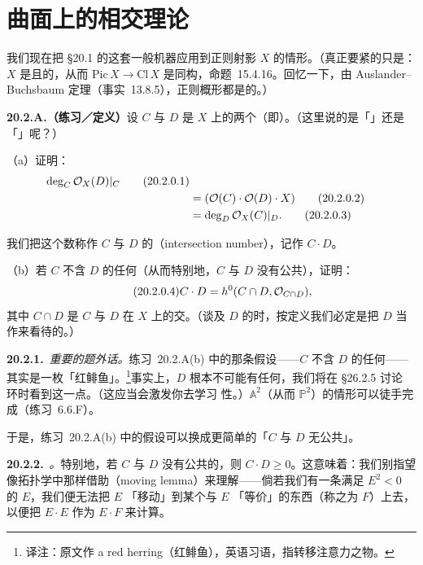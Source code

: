 
\section{曲面上的相交理论}

我们现在把 \S20.1 的这套一般机器应用到正则射影\trSurface{} $X$ 的情形。（真正要紧的只是：$X$ 是\trNoetherian{}且\trFactorial{}的，从而 $\mathrm{Pic}\,X\to\mathrm{Cl}\,X$ 是同构，\mbox{命题~15.4.16}。回忆一下，由 Auslander--Buchsbaum 定理（\mbox{事实~13.8.5}），正则概形都是\trFactorial{}的。）

\textbf{20.2.A.（练习／定义）}\quad 设 $C$ 与 $D$ 是 $X$ 上的两个\trEffectiveDivisor（即\trCurve{}）。（这里说的是「\trWeilDivisor」还是「\trCartierDivisor」呢？）

（a）证明：
\begin{align*}
\deg_C\mathcal{O}_X(D)|_C \tag{20.2.0.1}\label{eq:surface-intersection-deg-c}\\
&= (\mathcal{O}(C)\cdot\mathcal{O}(D)\cdot X) \tag{20.2.0.2}\label{eq:surface-intersection-euler}\\
&= \deg_D\mathcal{O}_X(C)|_D. \tag{20.2.0.3}\label{eq:surface-intersection-deg-d}
\end{align*}

我们把这个数称作 $C$ 与 $D$ 的\textbf{\trIntersectionNumber}（intersection number），记作 $C\cdot D$。

（b）若 $C$ 不含 $D$ 的任何\trAssociatedPoint（从而特别地，$C$ 与 $D$ 没有公共\trIrreducibleComponent），证明：
\begin{equation*}\tag{20.2.0.4}\label{eq:surface-intersection-h0}
C\cdot D=h^0(C\cap D,\mathcal{O}_{C\cap D}),
\end{equation*}
其中 $C\cap D$ 是 $C$ 与 $D$ 在 $X$ 上的\trSchemeTheoretic{}交。（谈及 $D$ 的\trAssociatedPoint{}时，按定义我们必定是把 $D$ 当作\trEffectiveCartierDivisor{}来看待的。）

\textbf{20.2.1.}\ \emph{重要的题外话。}\quad \mbox{练习~20.2.A(b)} 中的那条假设——$C$ 不含 $D$ 的任何\trAssociatedPoint——其实是一枚「红鲱鱼」。\footnote{译注：原文作 a red herring（红鲱鱼），英语习语，指转移注意力之物。}事实上，$D$ 根本不可能有任何\trEmbeddedPoint，我们将在 \S26.2.5 讨论 \trCM{}环时看到这一点。（这应当会激发你去学习 \trCM{}性。）$\mathbb{A}^2$（从而 $\mathbb{P}^2$）的情形可以徒手完成（\mbox{练习~6.6.F}）。

于是，\mbox{练习~20.2.A(b)} 中的假设可以换成更简单的「$C$ 与 $D$ 无公共\trIrreducibleComponent」。

\textbf{20.2.2.}\ \emph{\trhRemark。}\quad 特别地，若 $C$ 与 $D$ 没有公共的\trIrreducibleComponent，则 $C\cdot D\ge 0$。这意味着：我们别指望像拓扑学中那样借助\trMovingLemma（moving lemma）来理解\trIntersectionNumber——倘若我们有一条满足 $E^2<0$ 的\trIrreducible\trCurve{} $E$，我们便无法把 $E$ 「移动」到某个与 $E$ 「等价」的东西（称之为 $F$）上去，以便把 $E\cdot E$ 作为 $E\cdot F$ 来计算。

